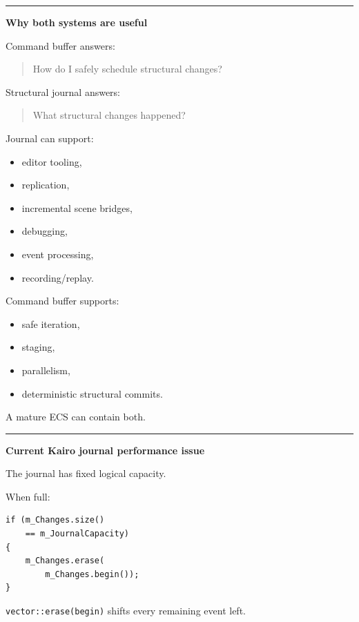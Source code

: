 \begin{center}\rule{0.5\linewidth}{0.5pt}\end{center}

\textbf{Why both systems are useful}

Command buffer answers:

\begin{quote}
How do I safely schedule structural changes?
\end{quote}

Structural journal answers:

\begin{quote}
What structural changes happened?
\end{quote}

Journal can support:

\begin{itemize}
\tightlist
\item
  editor tooling,
\item
  replication,
\item
  incremental scene bridges,
\item
  debugging,
\item
  event processing,
\item
  recording/replay.
\end{itemize}

Command buffer supports:

\begin{itemize}
\tightlist
\item
  safe iteration,
\item
  staging,
\item
  parallelism,
\item
  deterministic structural commits.
\end{itemize}

A mature ECS can contain both.

\begin{center}\rule{0.5\linewidth}{0.5pt}\end{center}

\textbf{Current Kairo journal performance issue}

The journal has fixed logical capacity.

When full:

\begin{verbatim}
if (m_Changes.size()
    == m_JournalCapacity)
{
    m_Changes.erase(
        m_Changes.begin());
}
\end{verbatim}

\texttt{vector::erase(begin)} shifts every remaining event left.


